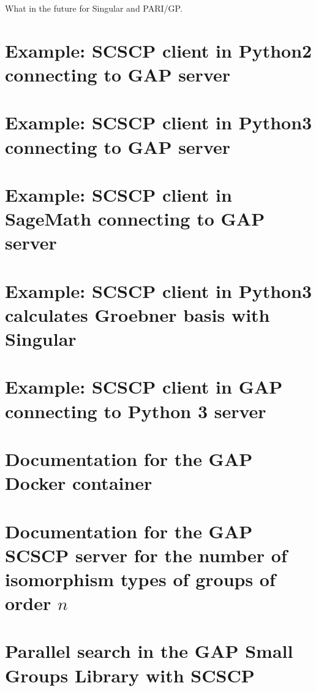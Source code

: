 \documentclass{deliverablereport}
\begin{document}
What in the future for Singular and PARI/GP.


\printbibliography

\newpage
\appendix

\section{Example: SCSCP client in Python2 connecting to GAP server}\label{python2-to-GAP}


\section{Example: SCSCP client in Python3 connecting to GAP server}\label{python3-to-GAP}


\section{Example: SCSCP client in SageMath connecting to GAP server}\label{SageMath-to-GAP}


\section{Example: SCSCP client in Python3 calculates Groebner basis with Singular}\label{Python3sympy-to-GAP-Singular}


\section{Example: SCSCP client in GAP connecting to Python 3 server}\label{GAP-to-Python3numpy}


\section{Documentation for the GAP Docker container}\label{SCSCP-with-GAP-docker}


\section{Documentation for the GAP SCSCP server for the number of isomorphism types of groups of order $n$}\label{Gnu-SCSCP-server}


\section{Parallel search in the GAP Small Groups Library with SCSCP}
\label{Parallel-GAP-SCSCP}

\end{document}
